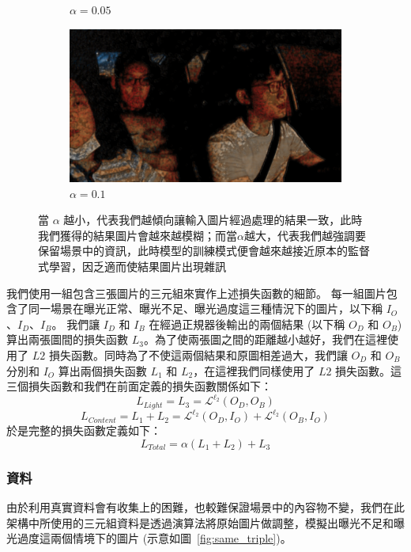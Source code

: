 \begin{figure}[htb]
\begin{subfigure}[b]{0.3\textwidth}
    \caption{$\alpha = 0.05$}
\end{subfigure}
\begin{subfigure}[b]{0.3\textwidth}
    \centering
    \includegraphics[width=\textwidth]{figures/alpha_01}
    \caption{$\alpha = 0.1$}
\end{subfigure}
\caption[不同$\alpha$下的輸出結果之比較]{當 $\alpha$ 越小，代表我們越傾向讓輸入圖片經過處理的結果一致，此時我們獲得的結果圖片會越來越模糊；而當$\alpha$越大，代表我們越強調要保留場景中的資訊，此時模型的訓練模式便會越來越接近原本的監督式學習，因乏適而使結果圖片出現雜訊}
\label{fig:alpha_compare}
\end{figure}

我們使用一組包含三張圖片的三元組來實作上述損失函數的細節。
每一組圖片包含了同一場景在曝光正常、曝光不足、曝光過度這三種情況下的圖片，以下稱 $I_O$、$I_D$、$I_B$。
我們讓 $I_D$ 和 $I_B$ 在經過正規器後輸出的兩個結果 (以下稱 $O_D$ 和 $O_B$) 算出兩張圖間的損失函數 $L_3$。為了使兩張圖之間的距離越小越好，我們在這裡使用了 $L2$ 損失函數。同時為了不使這兩個結果和原圖相差過大，我們讓 $O_D$ 和 $O_B$ 分別和 $I_O$ 算出兩個損失函數 $L_1$ 和 $L_2$，在這裡我們同樣使用了 $L2$ 損失函數。這三個損失函數和我們在前面定義的損失函數關係如下：
$$L_{Light} = L_3 = \mathcal{L}^{\ell_2}(O_D, O_B)$$
$$L_{Content} = L_1 + L_2 = \mathcal{L}^{\ell_2}(O_D, I_O) + \mathcal{L}^{\ell_2}(O_B, I_O)$$
於是完整的損失函數定義如下：
$$L_{Total} = \alpha (L_1 + L_2) + L_3$$

\subsubsection{資料}

由於利用真實資料會有收集上的困難，也較難保證場景中的內容物不變，我們在此架構中所使用的三元組資料是透過演算法將原始圖片做調整，模擬出曝光不足和曝光過度這兩個情境下的圖片 (示意如圖~\ref{fig:same_triple})。

